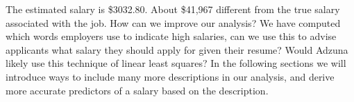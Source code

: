 \documentclass[12pt]{article}
\begin{document}
    The estimated salary is \$3032.80. About \$41,967 different from the true
    salary associated with the job. How can we improve our analysis? We have
    computed which words employers use to indicate high salaries, can we use
    this to advise applicants what salary they should apply for given their
    resume? Would Adzuna likely use this technique of linear least squares? In
    the following sections we will introduce ways to include many more
    descriptions in our analysis, and derive more accurate predictors of a
    salary based on the description.


\end{document}
